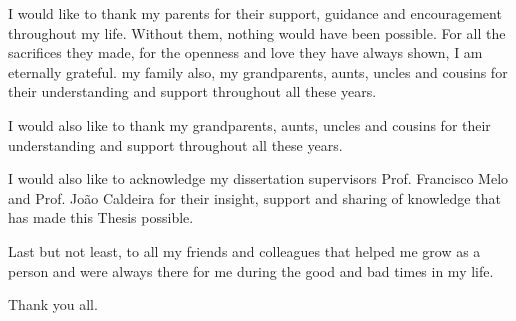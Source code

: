 

I would like to thank my parents for their support, guidance and encouragement throughout my life. Without them, nothing would have been possible. For all the sacrifices they made, for the openness and love they have always shown, I am eternally grateful. my family also, my grandparents, aunts, uncles and cousins for their understanding and support throughout all these years.

I would also like to thank my grandparents, aunts, uncles and cousins for their understanding and support throughout all these years.

I would also like to acknowledge my dissertation supervisors Prof. Francisco Melo and Prof. João Caldeira for their insight, support and sharing of knowledge that has made this Thesis possible.

Last but not least, to all my friends and colleagues that helped me grow as a person and were always there for me during the good and bad times in my life.

Thank you all.
